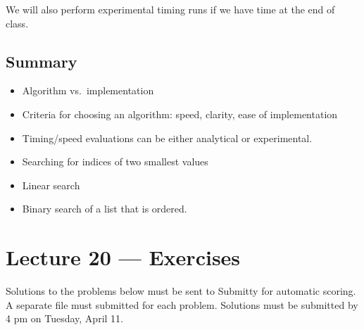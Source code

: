 \documentclass[letterpaper,10pt,english]{sphinxmanual}
\begin{document}
We will also perform experimental timing runs if we have time at the end
of class.


\section{Summary}
\label{\detokenize{lecture_notes/lec20_searching:summary}}\begin{itemize}
\item {} 
Algorithm vs. implementation

\item {} 
Criteria for choosing an algorithm: speed, clarity, ease of
implementation

\item {} 
Timing/speed evaluations can be either analytical or experimental.

\item {} 
Searching for indices of two smallest values

\item {} 
Linear search

\item {} 
Binary search of a list that is ordered.

\end{itemize}


\chapter{Lecture 20 — Exercises}
\label{\detokenize{lecture_notes/lec20_searching_exercises/exercises:lecture-20-exercises}}\label{\detokenize{lecture_notes/lec20_searching_exercises/exercises::doc}}
Solutions to the problems below must be sent to Submitty for
automatic scoring.  A separate file must submitted for each problem.
Solutions must be submitted by 4 pm on Tuesday, April 11.
\end{document}
